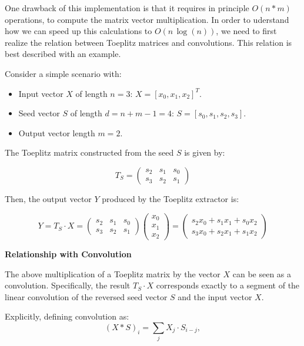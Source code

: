 One drawback of this implementation is that it requires in principle $O(n*m)$ operations, to compute the matrix vector multiplication. In order to uderstand how we can speed up this calculations to $O(n\, \log(n))$, we need to first realize the relation between Toeplitz matrices and convolutions. This relation is best described with an example.
\begin{example}
	
	Consider a simple scenario with:

	\begin{itemize}
		\item Input vector \( X \) of length \( n = 3 \): \( X = [x_0, x_1, x_2]^T \).
		\item Seed vector \( S \) of length \( d = n + m - 1 = 4 \): \( S = [s_0, s_1, s_2, s_3] \).
		\item Output vector length \( m = 2 \).
	\end{itemize}

	The Toeplitz matrix constructed from the seed \( S \) is given by:

	\[
	T_S = \begin{pmatrix}
	s_2 & s_1 & s_0 \\
	s_3 & s_2 & s_1
	\end{pmatrix}
	\]

	Then, the output vector \( Y \) produced by the Toeplitz extractor is:

	\[
	Y = T_S \cdot X =
	\begin{pmatrix}
	s_2 & s_1 & s_0 \\
	s_3 & s_2 & s_1
	\end{pmatrix}
	\begin{pmatrix}
	x_0 \\ x_1 \\ x_2
	\end{pmatrix}
	=
	\begin{pmatrix}
	s_2 x_0 + s_1 x_1 + s_0 x_2 \\
	s_3 x_0 + s_2 x_1 + s_1 x_2
	\end{pmatrix}
	\]

	\textbf{Relationship with Convolution}

	The above multiplication of a Toeplitz matrix by the vector \( X \) can be seen as a convolution. Specifically, the result \( T_S \cdot X \) corresponds exactly to a segment of the linear convolution of the reversed seed vector \( S \) and the input vector \( X \).

	Explicitly, defining convolution as:
	\[
	(X * S)_i = \sum_{j} X_j \cdot S_{i - j},
	\]


\end{example}
